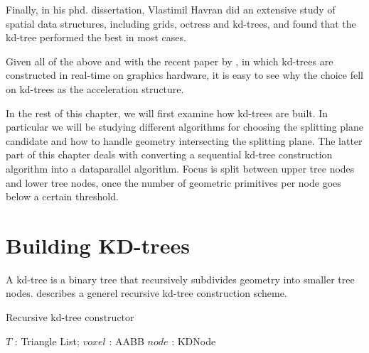 Finally, in his phd. dissertation, Vlastimil Havran did an extensive
study of spatial data structures, including grids, octress and
kd-trees, and found that the kd-tree performed the best in most cases.

Given all of the above and with the recent paper by \zhou{}, in which
kd-trees are constructed in real-time on graphics hardware, it is easy
to see why the choice fell on kd-trees as the acceleration structure.


In the rest of this chapter, we will first examine how kd-trees are
built. In particular we will be studying different algorithms for
choosing the splitting plane candidate and how to handle geometry
intersecting the splitting plane. The latter part of this chapter
deals with converting a sequential kd-tree construction algorithm into
a dataparallel algorithm. Focus is split between upper tree nodes and
lower tree nodes, once the number of geometric primitives per node
goes below a certain threshold.

\section{Building KD-trees}

A kd-tree is a binary tree that recursively subdivides geometry into
smaller tree nodes.  describes a generel
recursive kd-tree construction scheme.

\begin{algorithm}
  \caption{Recursive kd-tree constructor}
  \label{alg:kdTreeCreator}
  \begin{algorithmic}
              {$T$ : Triangle List; $voxel$ : AABB}
              {$node$ : KDNode}
              {
                \ELSE
                \ENDIF}
  \end{algorithmic}
\end{algorithm}

